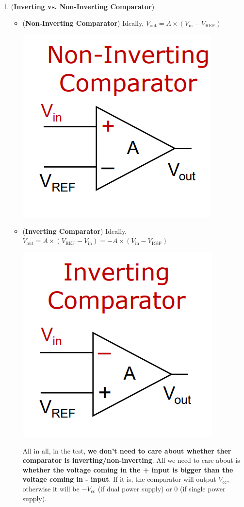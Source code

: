 \documentclass[10pt, landscape]{article}
\begin{document}
\begin{multicols}{4}
\begin{enumerate}
    \item (\textbf{Inverting vs. Non-Inverting Comparator})
    \begin{itemize}
        \item (\textbf{Non-Inverting Comparator}) Ideally, $V_{\text{out}}=A\times (V_{\text{in}}-V_{\text{REF}})$ \\
        \centerline{\includegraphics[width=0.3\linewidth]{images/non-inverting-comparator.png}}
        \item (\textbf{Inverting Comparator}) Ideally, $V_{\text{out}}=A\times (V_{\text{REF}}-V_{\text{in}})=-A\times (V_{\text{in}}-V_{\text{REF}})$ \\
        \centerline{\includegraphics[width=0.3\linewidth]{images/inverting-comparator.png}}
        All in all, in the test, \textbf{we don't need to care about whether ther comparator is inverting/non-inverting}. All we need to care about is \textbf{whether the voltage coming in the + input is bigger than the voltage coming in - input}. If it is, the comparator will output $V_{\text{cc}}$, otherwise it will be $-V_{\text{cc}}$ (if dual power supply) or $0$ (if single power supply).
    \end{itemize}
\end{enumerate}


\end{multicols}
\end{document}
